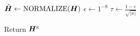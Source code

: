 \IncMargin{1em}
\vspace{-2mm}
\begin{algorithm}

\caption{$CLAMP_{\kappa}$}\label{alg:clamp}
$\hat{\boldsymbol{H}} \leftarrow \text{NORMALIZE}(\boldsymbol{H})$\;
$\epsilon\leftarrow 1^{-8}$\;
$\tau \leftarrow \frac{1-\epsilon}{\sqrt{|\kappa|}}$\;

Return $\boldsymbol{H}^\kappa$\;

\end{algorithm}
\vspace{-2mm}
\DecMargin{1em}